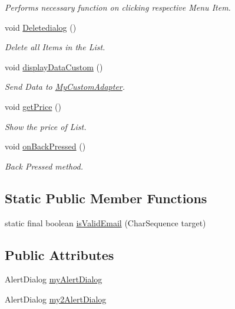 \begin{DoxyCompactItemize}
\begin{DoxyCompactList}\small\item\em Performs necessary function on clicking respective Menu Item. \end{DoxyCompactList}\item 
void \hyperlink{classcom_1_1example_1_1santh_1_1shoppinglist_1_1_list_activity_ac120c9e11a30ad182b0c2e146bbc420a}{Deletedialog} ()
\begin{DoxyCompactList}\small\item\em Delete all Items in the List. \end{DoxyCompactList}\item 
void \hyperlink{classcom_1_1example_1_1santh_1_1shoppinglist_1_1_list_activity_a3e5d96fe6cb761f9b036c552a5078406}{display\+Data\+Custom} ()
\begin{DoxyCompactList}\small\item\em Send Data to \hyperlink{classcom_1_1example_1_1santh_1_1shoppinglist_1_1_my_custom_adapter}{My\+Custom\+Adapter}. \end{DoxyCompactList}\item 
void \hyperlink{classcom_1_1example_1_1santh_1_1shoppinglist_1_1_list_activity_ae309a9528aeacc4614e63dd6946bbdfe}{get\+Price} ()
\begin{DoxyCompactList}\small\item\em Show the price of List. \end{DoxyCompactList}\item 
void \hyperlink{classcom_1_1example_1_1santh_1_1shoppinglist_1_1_list_activity_a5941058d8bb35fffa810cdc1bc7cb78b}{on\+Back\+Pressed} ()
\begin{DoxyCompactList}\small\item\em Back Pressed method. \end{DoxyCompactList}\end{DoxyCompactItemize}
\subsection*{Static Public Member Functions}
\begin{DoxyCompactItemize}
\item 
static final boolean \hyperlink{classcom_1_1example_1_1santh_1_1shoppinglist_1_1_list_activity_a67c3e8b285551793d2095968b583c92e}{is\+Valid\+Email} (Char\+Sequence target)
\end{DoxyCompactItemize}
\subsection*{Public Attributes}
\begin{DoxyCompactItemize}
\item 
Alert\+Dialog \hyperlink{classcom_1_1example_1_1santh_1_1shoppinglist_1_1_list_activity_a10f069d18425057cd9c3c13a3a1ab011}{my\+Alert\+Dialog}
\item 
Alert\+Dialog \hyperlink{classcom_1_1example_1_1santh_1_1shoppinglist_1_1_list_activity_ad19898c97695f5a48727227122c055dd}{my2\+Alert\+Dialog}
\end{DoxyCompactItemize}
